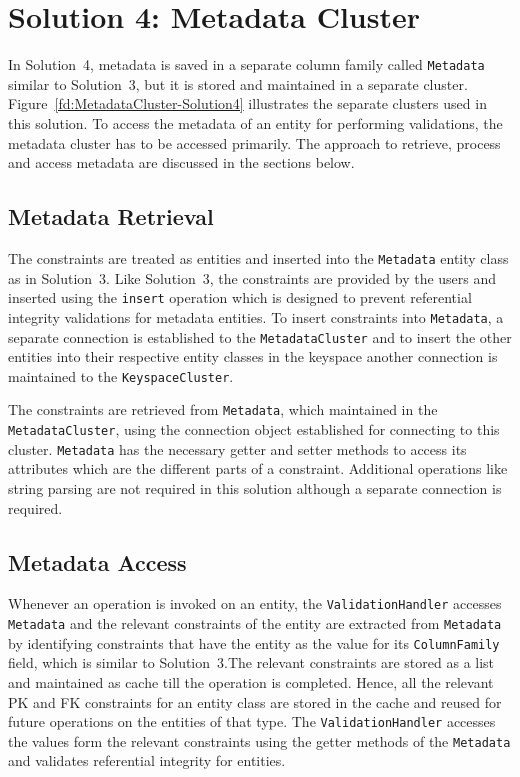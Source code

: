 \section{Solution 4:  Metadata Cluster}\label{s:Implementation-Solution4}
In Solution~4, metadata is saved in a separate column family called
\texttt{Metadata} similar to Solution~3, but it is stored and maintained in a
separate cluster. Figure~\ref{fd:MetadataCluster-Solution4} illustrates the
separate clusters used in this solution. To access the metadata of an entity for 
performing validations, the
metadata cluster has to be accessed primarily. The approach to retrieve, process
and access metadata are discussed in the sections below.

\subsection{Metadata Retrieval}
The constraints are treated as entities and inserted into the \texttt{Metadata}
entity class as in Solution~3. Like Solution~3, the constraints
are provided by the users and inserted using the \texttt{insert} operation which
is designed to prevent referential integrity validations for metadata entities.
 To insert constraints into \texttt{Metadata}, a separate
connection is established to the \texttt{MetadataCluster} and to insert the other entities
into their respective entity classes in the keyspace another connection is
maintained to the \texttt{KeyspaceCluster}.

The constraints are retrieved from  \texttt{Metadata}, which 
maintained in the \texttt{MetadataCluster}, using the connection object
established for connecting to this cluster.  \texttt{Metadata}
has the necessary getter and setter methods to access its attributes which are
the different parts of a constraint. Additional operations like string parsing
are not required in this solution although a separate connection is required.

\subsection{Metadata Access}

 
Whenever an operation is invoked on an entity, the \texttt{ValidationHandler}
accesses \texttt{Metadata} and the relevant constraints of the entity are
extracted from \texttt{Metadata} by identifying constraints that have  the entity as the value
for its \texttt{ColumnFamily} field, which is similar to Solution~3.The relevant constraints
are stored as a list and maintained as cache till the operation is completed.
Hence, all the relevant \ac{PK} and \ac{FK} constraints for an entity class are
stored in the cache and reused for future operations on the entities of that
type.%
The \texttt{ValidationHandler} accesses the values form the relevant constraints
using the getter methods of the \texttt{Metadata} and validates referential
integrity for entities.

